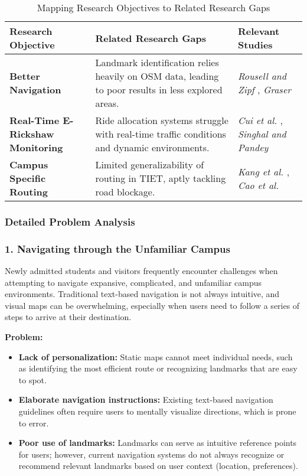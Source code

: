 \begin{table}[H]
	\centering
	\caption{Mapping Research Objectives to Related Research Gaps}
	\fontsize{10}{12}\selectfont
	\label{tab:research-gaps}
	\begin{tabularx}{\textwidth}{|X|X|X|}
		\hline
		\textbf{Research Objective}              & \textbf{Related Research Gaps}                                                                      & \textbf{Relevant Studies}                                                            \\
		\hline
		\textbf{Better Navigation}               & Landmark identification relies heavily on OSM data, leading to poor results in less explored areas. & \textit{Rousell and Zipf} \cite{rousell-2017}, \textit{Graser} \cite{graser-2017}    \\
		\hline
		\textbf{Real-Time E-Rickshaw Monitoring} & Ride allocation systems struggle with real-time traffic conditions and dynamic environments.        & \textit{Cui et al.} \cite{cui-2022}, \textit{Singhal and Pandey} \cite{singhal-2016} \\
		\hline
		\textbf{Campus Specific Routing}         & Limited generalizability of routing in TIET, aptly tackling road blockage.                          & \textit{Kang et al.} \cite{kang-2024}, \textit{Cao et al.} \cite{cao-2021}           \\
		\hline
	\end{tabularx}
\end{table}



\subsubsection{Detailed Problem Analysis}

\subsubsection*{1. Navigating through the Unfamiliar Campus}
Newly admitted students and visitors frequently encounter challenges when attempting to navigate expansive, complicated, and unfamiliar campus environments. Traditional text-based navigation is not always intuitive, and visual maps can be overwhelming, especially when users need to follow a series of steps to arrive at their destination.

\textbf{Problem:}
\begin{itemize}
	\item \textbf{Lack of personalization:} Static maps cannot meet individual needs, such as identifying the most efficient route or recognizing landmarks that are easy to spot.
	\item \textbf{Elaborate navigation instructions:} Existing text-based navigation guidelines often require users to mentally visualize directions, which is prone to error.
	\item \textbf{Poor use of landmarks:} Landmarks can serve as intuitive reference points for users; however, current navigation systems do not always recognize or recommend relevant landmarks based on user context (location, preferences).
\end{itemize}

